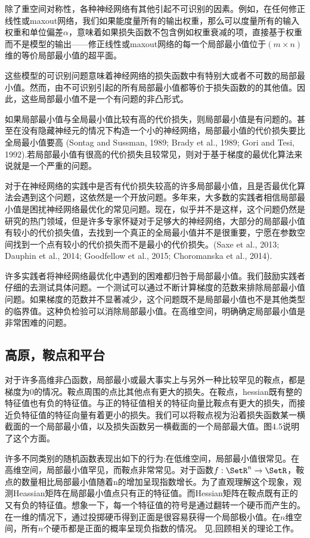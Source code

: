除了重空间对称性，各种神经网络有其他引起不可识别的因素。例如，在任何修正线性或maxout网络，我们如果能度量所有的输出权重，那么可以度量所有的输入权重和单位偏差$\alpha$，意味着如果损失函数不包含例如权重衰减的项，直接基于权重而不是模型的输出——修正线性或maxout网络的每一个局部最小值位于$(m\times n)$维的等价局部最小值的超平面。

这些模型的可识别问题意味着神经网络的损失函数中有特别大或者不可数的局部最小值。然而，由不可识别引起的所有局部最小值都等价于损失函数的的其他值。因此，这些局部最小值不是一个有问题的非凸形式。

如果局部最小值与全局最小值比较有高的代价损失，则局部最小值是有问题的。甚至在没有隐藏神经元的情况下构造一个小的神经网络，局部最小值的代价损失要比全局最小值要高
(Sontag and Sussman, 1989; Brady et al., 1989; Gori and Tesi, 1992).若局部最小值有很高的代价损失且较常见，则对于基于梯度的最优化算法来说就是一个严重的问题。

对于在神经网络的实践中是否有代价损失较高的许多局部最小值，且是否最优化算法会遇到这个问题，这依然是一个开放问题。多年来，大多数的实践者相信局部最小值是困扰神经网络最优化的常见问题。现在，似乎并不是这样，这个问题仍然是研究的热门领域，但是许多专家怀疑对于足够大的神经网络，大部分的局部最小值有较小的代价损失值，去找到一个真正的全局最小值并不是很重要，宁愿在参数空间找到一个点有较小的代价损失而不是最小的代价损失。(Saxe et al., 2013; Dauphin et al., 2014; Goodfellow et al., 2015; Choromanska et al., 2014).

许多实践者将神经网络最优化中遇到的困难都归咎于局部最小值。我们鼓励实践者仔细的去测试具体问题。一个测试可以通过不断计算梯度的范数来排除局部最小值问题。如果梯度的范数并不显著减少，这个问题既不是局部最小值也不是其他类型的临界值。这种负检验可以消除局部最小值。在高维空间，明确确定局部最小值是非常困难的问题。

\subsection{高原，鞍点和平台}
对于许多高维非凸函数，局部最小或最大事实上与另外一种比较罕见的鞍点，都是梯度为0的情况。鞍点周围的点比其他点有更大的损失。在鞍点，\gls{hessian}既有整的特征值也有负的特征值。与正的特征值相关的特征向量比鞍点有更大的损失，而接近负特征值的特征向量有着更小的损失。我们可以将鞍点视为沿着损失函数某一横截面的一个局部最小值，以及损失函数另一横截面的一个局部最大值。图4.5说明了这个方面。

许多不同类别的随机函数表现出如下的行为:在低维空间，局部最小值很常见。在高维空间，局部最小值罕见，而鞍点非常常见。对于函数$f:\SetR^n \to \SetR$，鞍点的数量相比局部最小值随着n的增加呈现指数增长。为了直观理解这个现象，观测Heassian矩阵在局部最小值点只有正的特征值。而Hessian矩阵在鞍点既有正的又有负的特征值。想象一下，每一个特征值的符号是通过翻转一个硬币而产生的。在一维的情况下，通过投掷硬币得到正面是很容易获得一个局部极小值。在$n$维空间，所有$n$个硬币都是正面的概率呈现负指数的情况。
见\cite{Dauphin-et-al-NIPS2014-small},回顾相关的理论工作。

